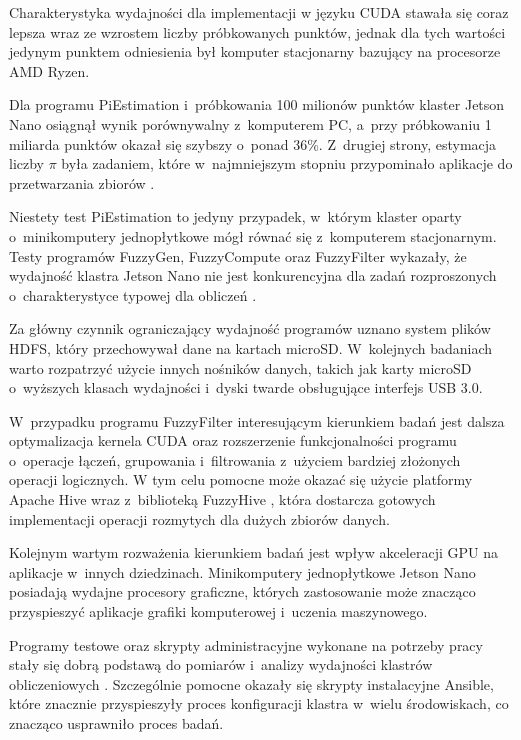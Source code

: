 Charakterystyka wydajności dla implementacji w języku CUDA stawała się coraz lepsza wraz ze wzrostem
liczby próbkowanych punktów, jednak dla tych wartości jedynym punktem odniesienia był komputer
stacjonarny bazujący na procesorze AMD Ryzen.

Dla programu PiEstimation i~próbkowania 100 milionów punktów klaster Jetson Nano osiągnął wynik
porównywalny z~komputerem PC, a~przy próbkowaniu 1 miliarda punktów okazał się szybszy o~ponad 36\%.
Z~drugiej strony, estymacja liczby $\pi$ była zadaniem, które w~najmniejszym stopniu przypominało
aplikacje do przetwarzania zbiorów .

Niestety test PiEstimation to jedyny przypadek, w~którym klaster oparty o~minikomputery jednopłytkowe
mógł równać się z~komputerem stacjonarnym. Testy programów FuzzyGen, FuzzyCompute oraz FuzzyFilter
wykazały, że wydajność klastra Jetson Nano nie jest konkurencyjna dla zadań rozproszonych
o~charakterystyce typowej dla obliczeń .

Za główny czynnik ograniczający wydajność programów uznano system plików HDFS, który przechowywał
dane na kartach microSD. W~kolejnych badaniach warto rozpatrzyć użycie innych nośników danych,
takich jak karty microSD o~wyższych klasach wydajności i~dyski twarde obsługujące interfejs USB 3.0.

W~przypadku programu FuzzyFilter interesującym kierunkiem badań jest dalsza optymalizacja kernela
CUDA oraz rozszerzenie funkcjonalności programu o~operacje łączeń, grupowania i~filtrowania z~użyciem
bardziej złożonych operacji logicznych. W tym celu pomocne może okazać się użycie platformy Apache
Hive wraz z~biblioteką FuzzyHive \cite{fuzzy-hive}, która dostarcza gotowych implementacji operacji
rozmytych dla dużych zbiorów danych. 

Kolejnym wartym rozważenia kierunkiem badań jest wpływ akceleracji GPU na aplikacje w~innych
dziedzinach. Minikomputery jednopłytkowe Jetson Nano posiadają wydajne procesory graficzne,
których zastosowanie może znacząco przyspieszyć aplikacje grafiki komputerowej i~uczenia maszynowego.

Programy testowe oraz skrypty administracyjne wykonane na potrzeby pracy stały się dobrą podstawą do
pomiarów i~analizy wydajności klastrów obliczeniowych . Szczególnie pomocne okazały
się skrypty instalacyjne Ansible, które znacznie przyspieszyły proces konfiguracji klastra w~wielu
środowiskach, co znacząco usprawniło proces badań.
